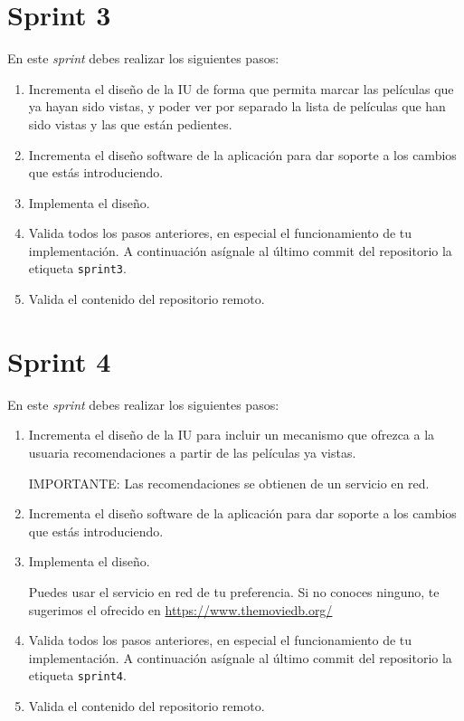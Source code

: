 \documentclass[11pt,a4paper]{article}
\begin{document}
\section{Sprint 3}

En este \emph{sprint} debes realizar los siguientes pasos:

\begin{enumerate}
\item Incrementa el diseño de la IU de forma que permita marcar las
  películas que ya hayan sido vistas, y poder ver por separado la
  lista de películas que han sido vistas y las que están pedientes.

\item Incrementa el diseño software de la aplicación para dar soporte
  a los cambios que estás introduciendo.

\item Implementa el diseño.

\item Valida todos los pasos anteriores, en especial el funcionamiento
  de tu implementación. A continuación asígnale al último commit del
  repositorio la etiqueta \texttt{sprint3}.

\item Valida el contenido del repositorio remoto.
\end{enumerate}



\section{Sprint 4}


En este \emph{sprint} debes realizar los siguientes pasos:

\begin{enumerate}
\item Incrementa el diseño de la IU para incluir un mecanismo que
  ofrezca a la usuaria recomendaciones a partir de las películas ya
  vistas.

  IMPORTANTE: Las recomendaciones se obtienen de un servicio en red.

\item Incrementa el diseño software de la aplicación para dar soporte
  a los cambios que estás introduciendo.

\item Implementa el diseño.

  Puedes usar el servicio en red de tu preferencia. Si no conoces ninguno,
  te sugerimos el ofrecido en \url{https://www.themoviedb.org/}

\item Valida todos los pasos anteriores, en especial el funcionamiento
  de tu implementación. A continuación asígnale al último commit del
  repositorio la etiqueta \texttt{sprint4}.

\item Valida el contenido del repositorio remoto.
\end{enumerate}
\end{document}
